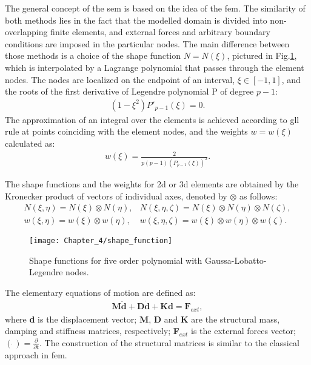 \documentclass[11pt,a4paper,final]{report}
\begin{document}
The general concept of the \ac{sem} is based on the idea of the \ac{fem}.
The similarity of both methods lies in the fact that the modelled domain is divided into non-overlapping finite elements, and external forces and arbitrary boundary conditions are imposed in the particular nodes.
The main difference between those methods is a choice of the shape function \( N=N(\xi )\), pictured in Fig.\ref{fig:shape}, which is interpolated by a Lagrange polynomial that passes through the element nodes.
The nodes are localized on the endpoint of an interval, \(\xi\in[-1,1]\), and the roots of the first derivative of Legendre polynomial P of degree \(p-1\):
\begin{eqnarray}
	(1-\xi^2)P'_{p-1}(\xi)=0.
	\label{eq:nodes}
\end{eqnarray}
The approximation of an integral over the elements is achieved according to \ac{gll} rule at points coinciding with the element nodes, 
and the weights \(w=w(\xi)\) calculated as:
\begin{eqnarray}
	{w(\xi)} = \frac{2}{p(p-1)(P_{p-1}(\xi))^2}.
	\label{eq:weights}
\end{eqnarray}

The shape functions and the weights for \ac{2d} or \ac{3d} elements are obtained by the Kronecker product of vectors of individual axes, denoted by \(\otimes\) as follows:
\begin{eqnarray}
	N(\xi,\eta) = N(\xi)\otimes N(\eta), & N(\xi,\eta,\zeta) = N(\xi)\otimes N(\eta)\otimes N(\zeta), \nonumber\\
	w(\xi,\eta) = w(\xi)\otimes w(\eta), & w(\xi,\eta,\zeta) = w(\xi)\otimes w(\eta)\otimes w(\zeta).
	\label{eq:3Dshape_weights}
\end{eqnarray}
\begin{figure}[H]
	\begin{center}
		\texttt{[image: Chapter\_4/shape\_function]}
	\end{center}
	\caption{Shape functions for five order polynomial with Gaussa-Lobatto-Legendre nodes.}
	\label{fig:shape}
\end{figure}

The elementary equations of motion are defined as:
\begin{eqnarray}
	\label{eq:motion}
	\textbf{M} \ddot{\textbf{d}} + \textbf{D} \dot{\textbf{d}} + \textbf{K} \textbf{d} = \textbf{F}_{ext},
\end{eqnarray}
where \textbf{d} is the displacement vector; \textbf{M}, \textbf{D} and \textbf{K} are the structural mass, damping and stiffness matrices, respectively; \textbf{F}$_{ext}$ is the external forces vector; \((\dot{\ })=\frac{\partial}{\partial t}\). 
The construction of the structural matrices is similar to the classical approach in \ac{fem}.
\end{document}
